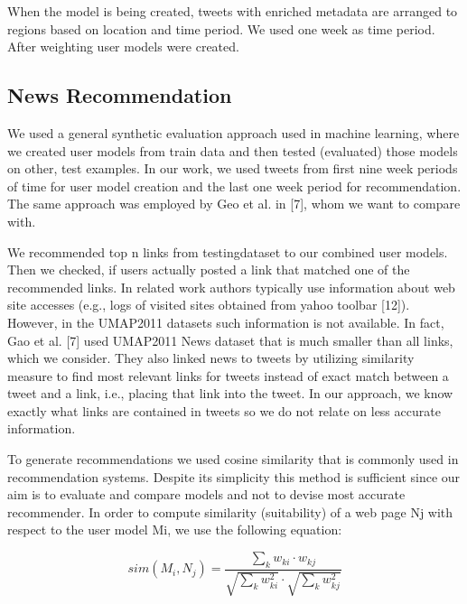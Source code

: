\documentclass[a4, conference]{IEEEtran}
\begin{document}
 When  the  model  is  being  created,  tweets  with  enriched metadata are arranged to regions based on location and time period.  We  used  one  week  as  time  period.  After  weighting user models were created. 

\subsection{News Recommendation}

 We used a general synthetic evaluation approach used in machine  learning,  where  we  created user  models  from  train data  and  then  tested  (evaluated)  those  models  on  other,  test examples. In our work, we used tweets from first nine week periods of time for user model creation and the last one week period   for   recommendation.   The   same   approach   was employed  by  Geo  et  al.  in  [7],  whom  we  want  to  compare with. 

We recommended  top n  links from  testingdataset  to  our combined  user  models.  Then  we  checked,  if  users  actually posted a link that matched one of the recommended links. In related work authors typically use information about web site accesses  (e.g.,  logs  of  visited  sites  obtained  from  yahoo toolbar  [12]).  However,  in  the  UMAP2011  datasets  such information  is  not  available.  In  fact,  Gao  et  al.  [7]  used UMAP2011 News dataset that is much smaller than all links, which  we  consider.  They  also  linked  news  to  tweets by utilizing  similarity  measure  to  find  most  relevant links  for tweets  instead  of  exact  match  between  a  tweet  and  a  link, i.e.,  placing  that  link  into  the  tweet.  In  our  approach,  we know exactly what links are contained in tweets so we do not relate on less accurate information.

 To  generate  recommendations  we  used  cosine  similarity that  is  commonly  used  in  recommendation  systems.  Despite its  simplicity  this  method  is  sufficient  since  our aim  is  to evaluate   and   compare   models   and   not   to   devise   most accurate   recommender.   In   order   to   compute   similarity (suitability)  of  a  web page Nj with  respect to the  user model Mi, we use the following equation:

\begin{equation}
sim(M_{i},N_{j})=\frac{\sum_{k}w_{ki}\cdotp w_{kj}}{\sqrt{\sum_{k}w_{ki}^2}\cdotp \sqrt{\sum_{k}w_{kj}^2}}
\end{equation}
\end{document}
